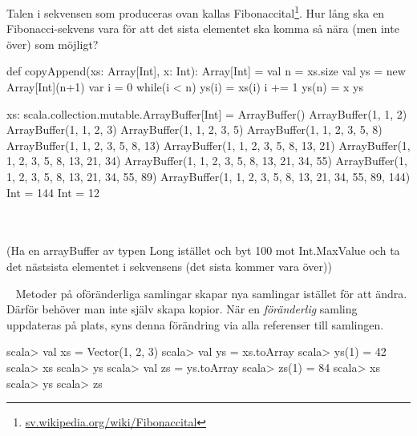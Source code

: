 \Subtask Talen i sekvensen som produceras ovan kallas Fibonaccital\footnote{\href{https://sv.wikipedia.org/wiki/Fibonaccital}{sv.wikipedia.org/wiki/Fibonaccital}}. Hur lång ska en Fibonacci-sekvens vara för att det sista elementet ska komma så nära (men inte över)  som möjligt?



\SOLUTION


\TaskSolved \what


\SubtaskSolved  \begin{Code}
def copyAppend(xs: Array[Int], x: Int): Array[Int] = {
  val n = xs.size
  val ys = new Array[Int](n+1)
  var i = 0
  while(i < n) {
    ys(i) = xs(i)
    i += 1
  }
  ys(n) = x
  ys
}
\end{Code}

\SubtaskSolved  \begin{REPL}
xs: scala.collection.mutable.ArrayBuffer[Int] = ArrayBuffer()
ArrayBuffer(1, 1, 2)
ArrayBuffer(1, 1, 2, 3)
ArrayBuffer(1, 1, 2, 3, 5)
ArrayBuffer(1, 1, 2, 3, 5, 8)
ArrayBuffer(1, 1, 2, 3, 5, 8, 13)
ArrayBuffer(1, 1, 2, 3, 5, 8, 13, 21)
ArrayBuffer(1, 1, 2, 3, 5, 8, 13, 21, 34)
ArrayBuffer(1, 1, 2, 3, 5, 8, 13, 21, 34, 55)
ArrayBuffer(1, 1, 2, 3, 5, 8, 13, 21, 34, 55, 89)
ArrayBuffer(1, 1, 2, 3, 5, 8, 13, 21, 34, 55, 89, 144)
Int = 144
Int = 12
\end{REPL}

\SubtaskSolved  {}\\
\\
(Ha en arrayBuffer av typen Long istället och byt 100 mot Int.MaxValue och ta det nästsista elementet i sekvensens (det sista kommer vara över))


\QUESTEND









\QUESTBEGIN

\Task  \what~  Metoder på oföränderliga samlingar skapar nya samlingar istället för att ändra. Därför behöver man inte själv skapa kopior. När en \emph{föränderlig} samling uppdateras på plats, syns denna förändring via alla referenser till samlingen.

\begin{REPL}
scala> val xs = Vector(1, 2, 3)
scala> val ys = xs.toArray
scala> ys(1) = 42
scala> xs
scala> ys
scala> val zs = ys.toArray
scala> zs(1) = 84
scala> xs
scala> ys
scala> zs
\end{REPL}

